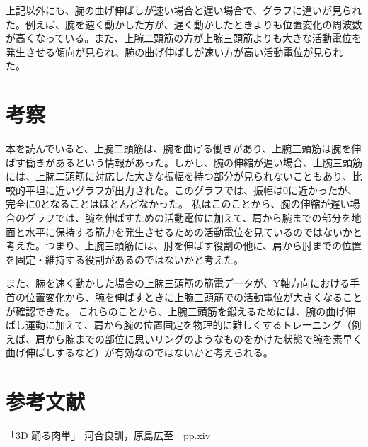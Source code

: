 \documentclass{jsarticle}
\begin{document}
上記以外にも、腕の曲げ伸ばしが速い場合と遅い場合で、グラフに違いが見られた。例えば、腕を速く動かした方が、遅く動かしたときよりも位置変化の周波数が高くなっている。また、上腕二頭筋の方が上腕三頭筋よりも大きな活動電位を発生させる傾向が見られ、腕の曲げ伸ばしが速い方が高い活動電位が見られた。

\section{考察}

本を読んでいると、上腕二頭筋は、腕を曲げる働きがあり、上腕三頭筋は腕を伸ばす働きがあるという情報があった\cite{reference}。しかし、腕の伸縮が遅い場合、上腕三頭筋には、上腕二頭筋に対応した大きな振幅を持つ部分が見られないこともあり、比較的平坦に近いグラフが出力された。このグラフでは、振幅は0に近かったが、完全に0となることはほとんどなかった。
私はこのことから、腕の伸縮が遅い場合のグラフでは、腕を伸ばすための活動電位に加えて、肩から腕までの部分を地面と水平に保持する筋力を発生させるための活動電位を見ているのではないかと考えた。つまり、上腕三頭筋には、肘を伸ばす役割の他に、肩から肘までの位置を固定・維持する役割があるのではないかと考えた。

また、腕を速く動かした場合の上腕三頭筋の筋電データが、Y軸方向における手首の位置変化から、腕を伸ばすときに上腕三頭筋での活動電位が大きくなることが確認できた。
これらのことから、上腕三頭筋を鍛えるためには、腕の曲げ伸ばし運動に加えて、肩から腕の位置固定を物理的に難しくするトレーニング（例えば、肩から腕までの部位に思いリングのようなものをかけた状態で腕を素早く曲げ伸ばしするなど）が有効なのではないかと考えられる。

\section{参考文献}
\begin{thebibliography}{9}
	 「3D 踊る肉単」 河合良訓，原島広至　pp.xiv
\end{thebibliography}
\end{document}
